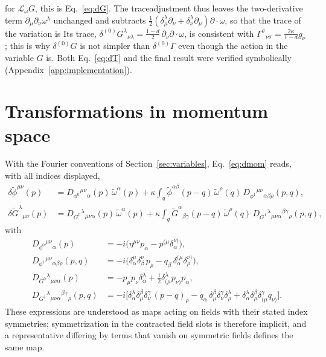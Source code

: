 \documentclass[prd,aps,preprint,superscriptaddress,nofootinbib,amsmath,amssymb,eqsecnum]{revtex4-2}
\newcommand{\tomega}{\tilde{\omega}}
\newcommand{\p}{\tilde{\phi}}
\newcommand{\G}{\tilde{G}}
\newcommand{\ip}[1]{\int_{#1}}
\providecommand{\DIFaddtex}[1]{{\protect\color{blue} \sf #1}} %
\providecommand{\DIFdeltex}[1]{{\protect\color{red} \scriptsize #1}} %
\providecommand{\DIFaddbegin}{} %
\providecommand{\DIFaddend}{} %
\providecommand{\DIFdelbegin}{} %
\providecommand{\DIFdelend}{} %
\providecommand{\DIFadd}[1]{\texorpdfstring{\DIFaddtex{#1}}{#1}} %
\providecommand{\DIFdel}[1]{\texorpdfstring{\DIFdeltex{#1}}{}} %
\begin{document}
\DIFdel{for $\mathcal{L}_\omega G$, this }\DIFdelend is Eq.~\eqref{eq:dG}. \DIFdelbegin \DIFdel{The traceadjustment thus leaves the two-derivative term
$\partial_\mu\partial_\nu\omega^\lambda$ unchanged and subtracts
$\tfrac12(\delta^\lambda_\mu\partial_\nu+\delta^\lambda_\nu\partial_\mu)\partial\!\cdot\!\omega$,
so that the trace of the variation is
}\DIFdelend \DIFaddbegin \DIFadd{Its trace,
}\DIFaddend $\delta^{(0)}G^{\lambda}{}_{\nu\lambda}=\tfrac{1-d}{2}\,\partial_\nu\partial\!\cdot\!\omega$,
\DIFaddbegin \DIFadd{is }\DIFaddend consistent with $\Gamma^{\sigma}{}_{\nu\sigma}=\frac{2\kappa}{1-d}g_\nu$\DIFdelbegin \DIFdel{; this is why
$\delta^{(0)}G$ is not simpler than $\delta^{(0)}\Gamma$ even though the action in the
variable $G$ is}\DIFdelend . Both
Eq.~\eqref{eq:dT} and the final result were verified symbolically
(Appendix~\ref{app:implementation}).

\section{Transformations in momentum space}
\label{app:momentum}

With the Fourier conventions of Section~\ref{sec:variables}, Eq.~\eqref{eq:dmom} reads, with
all indices displayed,
\begin{align}
\delta\p^{\mu\nu}(p)&=D_{\phi^0}{}^{\mu\nu}{}_{\alpha}(p)\,\tomega^\alpha(p)
+\kappa\ip{q}\p^{\alpha\beta}(p-q)\,\tomega^\rho(q)\,D_{\phi^1}{}^{\mu\nu}{}_{\alpha\beta\rho}(p,q),\\
\delta\G^{\lambda}{}_{\mu\nu}(p)&=D_{G^0}{}^{\lambda}{}_{\mu\nu\alpha}(p)\,\tomega^\alpha(p)
+\kappa\ip{q}\G^{\alpha}{}_{\beta\gamma}(p-q)\,\tomega^\rho(q)\,
D_{G^1}{}^{\lambda}{}_{\mu\nu\alpha}{}^{\beta\gamma}{}_{\rho}(p,q),
\end{align}
with
\begin{align}
D_{\phi^0}{}^{\mu\nu}{}_{\alpha}(p)&=-i\big(\eta^{\mu\nu}p_\alpha-p^{(\mu}\delta^{\nu)}_{\alpha}\big),\\
D_{\phi^1}{}^{\mu\nu}{}_{\alpha\beta\rho}(p,q)&=-i\big(\delta^{\mu}_{\alpha}\delta^{\nu}_{\beta}\,p_\rho
-q_\beta\,\delta^{(\mu}_{\alpha}\delta^{\nu)}_{\rho}\big),\\
D_{G^0}{}^{\lambda}{}_{\mu\nu\alpha}(p)&=-p_\mu p_\nu\delta^{\lambda}_{\alpha}
+\tfrac12\delta^{\lambda}_{(\mu}p_{\nu)}p_\alpha,\\
D_{G^1}{}^{\lambda}{}_{\mu\nu\alpha}{}^{\beta\gamma}{}_{\rho}(p,q)&=-i\big[
\delta^{\lambda}_{\alpha}\delta^{\beta}_{\mu}\delta^{\gamma}_{\nu}\,(p-q)_\rho
-q_\alpha\,\delta^{\beta}_{\mu}\delta^{\gamma}_{\nu}\delta^{\lambda}_{\rho}
+\delta^{\lambda}_{\alpha}\delta^{\beta}_{\rho}\delta^{\gamma}_{(\mu}q_{\nu)}\big].
\end{align}
These expressions are understood as maps acting on fields with their stated index
symmetries; symmetrization in the contracted field slots is therefore implicit, and a
representative differing by terms that vanish on symmetric fields defines the same map.
\end{document}
